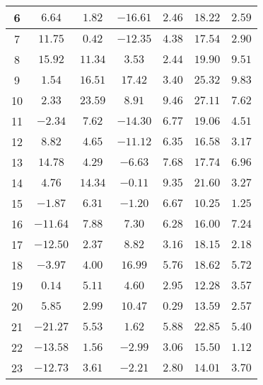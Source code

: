 \begin{table}[H]
\begin{tabular}{|c|c|c|c|c|c|c|}
                        6   & $6.64$    &  $1.82$   &  $-16.61$  &  $2.46$   & $18.22$  &  $2.59$   \\ \hline
                        7   & $11.75$   &  $0.42$   &  $-12.35$  &  $4.38$   & $17.54$  &  $2.90$   \\ \hline
                        8   & $15.92$   &  $11.34$  &  $3.53$    &  $2.44$   & $19.90$  &  $9.51$   \\ \hline
                        9   & $1.54$    &  $16.51$  &  $17.42$   &  $3.40$   & $25.32$  &  $9.83$   \\ \hline
                        10  & $2.33$    &  $23.59$  &  $8.91$    &  $9.46$   & $27.11$  &  $7.62$   \\ \hline
                        11  & $-2.34$   &  $7.62$   &  $-14.30$  &  $6.77$   & $19.06$  &  $4.51$   \\ \hline
                        12  & $8.82$    &  $4.65$   &  $-11.12$  &  $6.35$   & $16.58$  &  $3.17$   \\ \hline
                        13  & $14.78$   &  $4.29$   &  $-6.63$   &  $7.68$   & $17.74$  &  $6.96$   \\ \hline
                        14  & $4.76$    &  $14.34$  &  $-0.11$   &  $9.35$   & $21.60$  &  $3.27$   \\ \hline
                        15  & $-1.87$   &  $6.31$   &  $-1.20$   &  $6.67$   & $10.25$  &  $1.25$   \\ \hline
                        16  & $-11.64$  &  $7.88$   &  $7.30$    &  $6.28$   & $16.00$  &  $7.24$   \\ \hline
                        17  & $-12.50$  &  $2.37$   &  $8.82$    &  $3.16$   & $18.15$  &  $2.18$   \\ \hline
                        18  & $-3.97$   &  $4.00$   &  $16.99$   &  $5.76$   & $18.62$  &  $5.72$   \\ \hline
                        19  & $0.14$    &  $5.11$   &  $4.60$    &  $2.95$   & $12.28$  &  $3.57$   \\ \hline
                        20  & $5.85$    &  $2.99$   &  $10.47$   &  $0.29$   & $13.59$  &  $2.57$   \\ \hline
                        21  & $-21.27$  &  $5.53$   &  $1.62$    &  $5.88$   & $22.85$  &  $5.40$   \\ \hline
                        22  & $-13.58$  &  $1.56$   &  $-2.99$   &  $3.06$   & $15.50$  &  $1.12$   \\ \hline
                        23  & $-12.73$  &  $3.61$   &  $-2.21$   &  $2.80$   & $14.01$  &  $3.70$   \\ \hline

\end{tabular}
\end{table}

